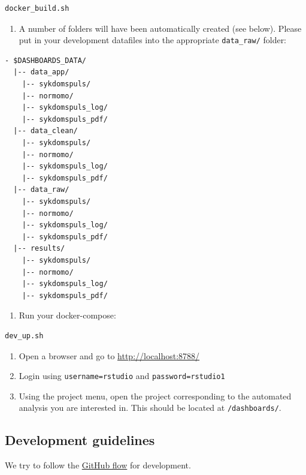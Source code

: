 \documentclass[12pt,]{article}
\providecommand{\tightlist}{%
  \setlength{\itemsep}{0pt}\setlength{\parskip}{0pt}}
\begin{document}
\begin{verbatim}
docker_build.sh
\end{verbatim}

\begin{enumerate}
\def\labelenumi{\arabic{enumi}.}
\setcounter{enumi}{8}
\tightlist
\item
  A number of folders will have been automatically created (see below).
  Please put in your development datafiles into the appropriate
  \texttt{data\_raw/} folder:
\end{enumerate}

\begin{verbatim}
- $DASHBOARDS_DATA/
  |-- data_app/
    |-- sykdomspuls/
    |-- normomo/
    |-- sykdomspuls_log/
    |-- sykdomspuls_pdf/
  |-- data_clean/
    |-- sykdomspuls/
    |-- normomo/
    |-- sykdomspuls_log/
    |-- sykdomspuls_pdf/
  |-- data_raw/
    |-- sykdomspuls/
    |-- normomo/
    |-- sykdomspuls_log/
    |-- sykdomspuls_pdf/
  |-- results/
    |-- sykdomspuls/
    |-- normomo/
    |-- sykdomspuls_log/
    |-- sykdomspuls_pdf/
\end{verbatim}

\begin{enumerate}
\def\labelenumi{\arabic{enumi}.}
\setcounter{enumi}{9}
\tightlist
\item
  Run your docker-compose:
\end{enumerate}

\begin{verbatim}
dev_up.sh
\end{verbatim}

\begin{enumerate}
\def\labelenumi{\arabic{enumi}.}
\setcounter{enumi}{10}
\tightlist
\item
  Open a browser and go to \url{http://localhost:8788/}
\item
  Login using \texttt{username=rstudio} and \texttt{password=rstudio1}
\item
  Using the project menu, open the project corresponding to the
  automated analysis you are interested in. This should be located at
  \texttt{/dashboards/}.
\end{enumerate}

\subsection{Development guidelines}\label{development-guidelines}

We try to follow the
\href{https://guides.github.com/introduction/flow/}{GitHub flow} for
development.
\end{document}
